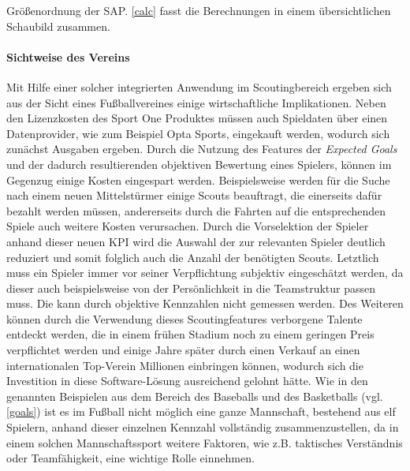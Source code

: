 Größenordnung der SAP. \vref{calc} fasst die Berechnungen in einem übersichtlichen Schaubild zusammen.




\paragraph{Sichtweise des Vereins}
Mit Hilfe einer solcher integrierten Anwendung im Scoutingbereich ergeben sich aus der Sicht eines Fußballvereines einige wirtschaftliche Implikationen. Neben den Lizenzkosten des Sport One Produktes müssen auch Spieldaten über einen Datenprovider, wie zum Beispiel Opta Sports, eingekauft werden, wodurch sich zunächst Ausgaben ergeben. Durch die Nutzung des Features der \textit{Expected Goals} und der dadurch resultierenden objektiven Bewertung eines Spielers, können im Gegenzug einige Kosten eingespart werden. Beispielsweise werden für die Suche nach einem neuen Mittelstürmer einige Scouts beauftragt, die einerseits dafür bezahlt werden müssen, andererseits durch die Fahrten auf die entsprechenden Spiele auch weitere Kosten verursachen. Durch die Vorselektion der Spieler anhand dieser neuen KPI wird die Auswahl der zur relevanten Spieler deutlich reduziert und somit folglich auch die Anzahl der benötigten Scouts. Letztlich muss ein Spieler immer vor seiner Verpflichtung subjektiv eingeschätzt werden, da dieser auch beispielsweise von der Persönlichkeit in die Teamstruktur passen muss. Die kann durch objektive Kennzahlen nicht gemessen werden. Des Weiteren können durch die Verwendung dieses Scoutingfeatures verborgene Talente entdeckt werden, die in einem frühen Stadium noch zu einem geringen Preis verpflichtet werden und einige Jahre später durch einen Verkauf an einen internationalen Top-Verein Millionen einbringen können, wodurch sich die Investition in diese Software-Lösung ausreichend gelohnt hätte. Wie in den genannten Beispielen aus dem Bereich des Baseballs und des Basketballs (vgl. \vref{goals}) ist es im Fußball nicht möglich eine ganze Mannschaft, bestehend aus elf Spielern, anhand dieser einzelnen Kennzahl vollständig zusammenzustellen, da in einem solchen Mannschaftssport weitere Faktoren, wie z.B. taktisches Verständnis oder Teamfähigkeit, eine wichtige Rolle einnehmen. 